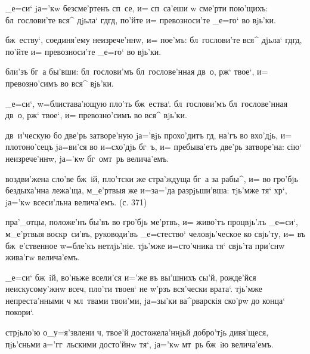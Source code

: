 _е=си` jа='кw безсме'ртенъ сп~се, и= сп~са'еши w\т 
сме'рти пою'щихъ: бл~гослови'те вся^ дjьла` гд гд, 
по'йте и= превозноси'те _е=го` во вjь'ки.

бж~еству`, соединя'ему неизрече'ннw, и= пое'мъ: 
бл~гослови'те вся^ дjьла` гд гд, по'йте и= 
превозноси'те _е=го` во вjь'ки.


бли'зъ бг~а бы'вши: бл~гослови'мъ бл~гослове'нная дв~о, 
рж` твое`, и= превозно'симъ во вся^ вjь'ки.

_е=си`, w=блистава'ющую пло'ть бж~ества`. бл~гослови'мъ 
бл~гослове'нная дв~о, рж` твое`, и= превозно'симъ во 
вся^ вjь'ки.



дв~и'ческую бо две'рь затворе'ную jа='вjь прохо'дитъ 
гд, на'гъ во вхо'дjь, и= плотоно'сецъ jа=ви'ся во 
и=схо'дjь бг~ъ, и= пребыва'етъ две'рь затворе'на: сiю` 
неизрече'ннw, jа='кw бг~омт~рь велича'емъ.

воздви'жена сло'ве бж~iй, пло'тски же стра'ждуща бг~а за 
рабы^, и= во гро'бjь бездыха'нна лежа'ща, м_е'ртвыя же 
и=з\ъ а='да разрjьши'вша: тjь'мже тя` хр`, jа='кw 
всеси'льна велича'емъ. (с. 371)

пра'_отцы, положе'нъ бы'въ во гро'бjь ме'ртвъ, и= живо'тъ 
процвjь'лъ _е=си`, м_е'ртвыя воскр~си'въ, руководи'въ 
_е=стество` человjь'ческое ко свjь'ту, и= въ 
бж~е'ственное w=бле'къ нетлjь'нiе. тjь'мже и=сто'чника 
тя` свjь'та при'снw жива'гw велича'емъ.

_е=си` бж~iй, во'ньже всели'ся и='же въ вы'шнихъ сы'й, 
рожде'йся неискусому'жнw всеч, пло'ти твоея` не 
w'рзъ вся'чески врата`. тjь'мже непреста'нными ч 
мл~твами твои'ми, jа=зы'ки ва^рварскiя ско'рw до конца` 
покори`.


стрjьло'ю о_у=я'звлени ч, твое'й достожела'ннjьй 
добро'тjь дивя'щеся, пjь'сньми а='гг~льскими досто'йнw 
тя`, jа='кw мт~рь бж~iю велича'емъ.

